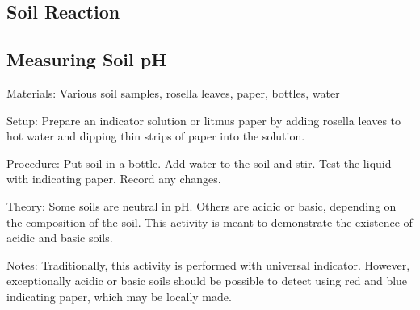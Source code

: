 \begin{multicols}{2}



\section*{Soil Reaction}

\subsection{Measuring Soil pH}


\begin{description*}
\item[Materials:]{Various soil samples, rosella leaves, paper, bottles, water}
\item[Setup:]{Prepare an indicator solution or litmus paper by adding rosella leaves to hot water and dipping thin strips of paper into the solution.}
\item[Procedure:]{Put soil in a bottle. Add water to the soil and stir. Test the liquid with indicating paper. Record any changes.}
\item[Theory:]{Some soils are neutral in pH. Others are acidic or basic, depending on the composition of the soil. This activity is meant to demonstrate the existence of acidic and basic soils. }
\item[Notes:]{Traditionally, this activity is performed with universal indicator. However, exceptionally acidic or basic soils should be possible to detect using red and blue indicating paper, which may be locally made.}
\end{description*}


\end{multicols}
